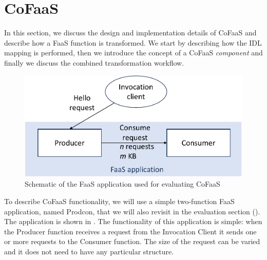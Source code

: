 \section{CoFaaS}


In this section, we discuss the design and implementation details of CoFaaS and describe how a FaaS function is transformed. We start by describing how the IDL mapping is performed, then we introduce the concept of a CoFaaS \emph{component} and finally we discuss the combined transformation workflow.

\begin{figure}
  \centering
  \includegraphics[width=\columnwidth]{figures/experimental_setup}
  \caption{\label{fig:func-setup} Schematic of the FaaS application used for evaluating CoFaaS}
\end{figure}

To describe CoFaaS functionality, we will use a simple two-function FaaS application, named Prodcon, that we will also revisit in the evaluation section (). The application is shown in . The functionality of this application is simple: when the Producer function receives a request from the Invocation Client it sends one or more requests to the Consumer function. The size of the request can be varied and it does not need to have any particular structure.

